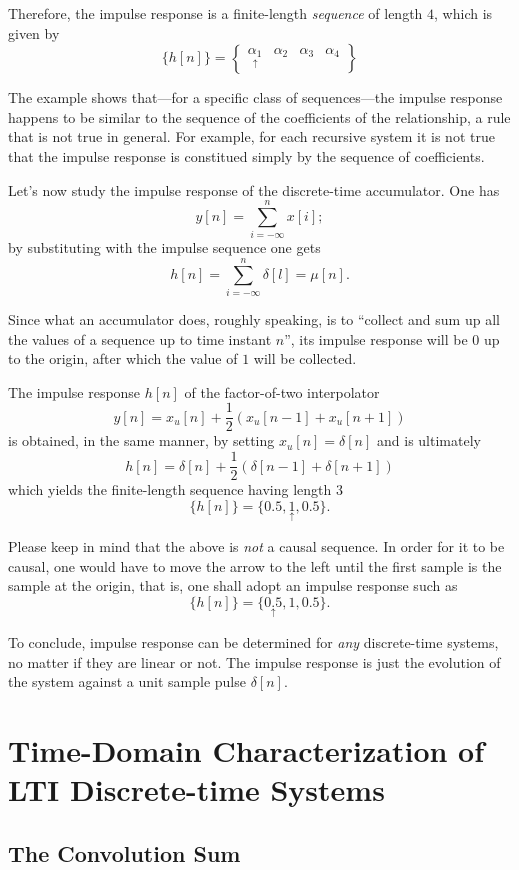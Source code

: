 \documentclass[\documentfontsize, twocolumn]{\classname}
\begin{document}
Therefore, the impulse response is a finite-length \emph{sequence} of length $4$, which is given by
\[
    \{h[n]\} = \begin{Bmatrix}\underset{\uparrow}{\alpha_1} & \alpha_2 & \alpha_3 & \alpha_4\end{Bmatrix}
\]

The example shows that---for a specific class of sequences---the impulse response happens to be similar to the sequence of the coefficients of the relationship, a rule that is not true in general. For example, for each recursive system it is not true that the impulse response is constitued simply by the sequence of coefficients.

Let's now study the impulse response of the discrete-time accumulator. One has
\[
    y[n] = \sum_{i=-\infty}^{n} x[i];
\]
by substituting with the impulse sequence one gets
\[
    h[n] = \sum_{i=-\infty}^{n} \delta[l] = \mu[n].
\]

Since what an accumulator does, roughly speaking, is to ``collect and sum up all the values of a sequence up to time instant $n$'', its impulse response will be $0$ up to the origin, after which the value of $1$ will be collected.

The impulse response $h[n]$ of the factor-of-two interpolator
\[
    y[n] = x_u[n] + \frac 1 2(x_u[n-1] + x_u[n+1])
\]
is obtained, in the same manner, by setting $x_u[n]=\delta[n]$ and is ultimately
\[
    h[n] = \delta[n] + \frac 1 2(\delta[n-1] + \delta[n+1])
\]
which yields the finite-length sequence having length $3$
\[
    \{h[n]\} = \{0.5, \underset{\uparrow}{1}, 0.5\}.
\]

Please keep in mind that the above is \emph{not} a causal sequence. In order for it to be causal, one would have to move the arrow to the left until the first sample is the sample at the origin, that is, one shall adopt an impulse response such as
\[
    \{h[n]\} = \{\underset{\uparrow}{0.5}, 1, 0.5\}.
\]

To conclude, impulse response can be determined for \emph{any} discrete-time systems, no matter if they are linear or not. The impulse response is just the evolution of the system against a unit sample pulse $\delta[n]$.

\section{Time-Domain Characterization of LTI Discrete-time Systems}

\subsection{The Convolution Sum}
\end{document}
